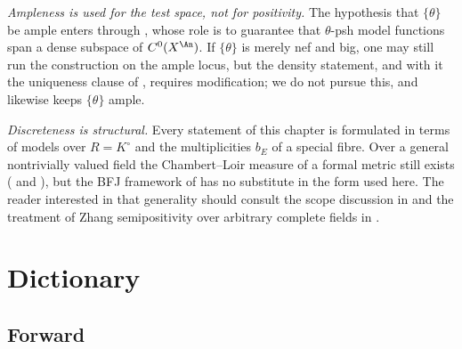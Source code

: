 \emph{Ampleness is used for the test space, not for positivity.}  The
hypothesis that \(\{\theta\}\) be ample enters through
, whose role is to guarantee that
\(\theta\)-psh model functions span a dense subspace of
\(C^0(X^{\An})\).  If \(\{\theta\}\) is merely nef and big, one may still run
the construction on the ample locus, but the density statement, and with it
the uniqueness clause of , requires
modification; we do not pursue this, and  likewise
keeps \(\{\theta\}\) ample.

\emph{Discreteness is structural.}  Every statement of this chapter is
formulated in terms of models over \(R=K^\circ\) and the multiplicities
\(b_E\) of a special fibre.  Over a general nontrivially valued field the
Chambert--Loir measure of a formal metric still exists
( and ), but
the BFJ framework of  has no substitute in the
form used here.  The reader interested in that generality should consult the
scope discussion in  and the treatment of
Zhang semipositivity over arbitrary complete fields in \cite{GM19}.

\section{Dictionary}
\label{sec:ch24-dictionary}

\subsection{Forward}
\label{sec:ch24-dict-forward}

